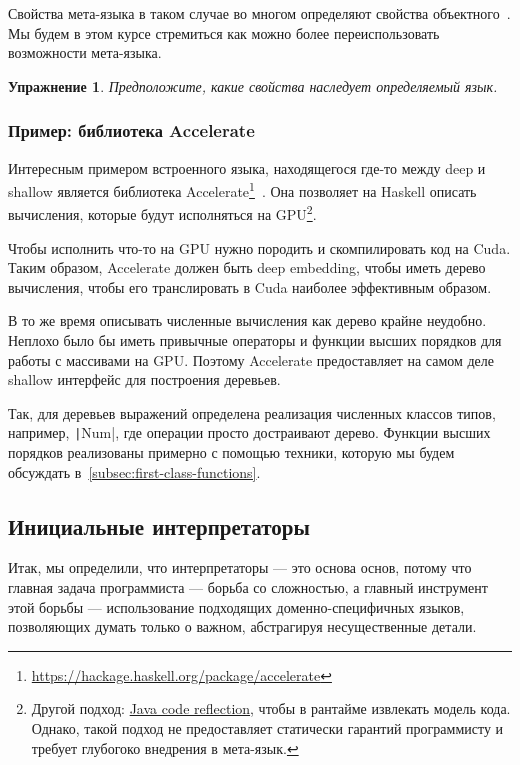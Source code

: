 \documentclass[12pt]{article}
\newtheorem{task}{Упражнение}
\begin{document}
    Свойства мета-языка в таком случае во многом определяют свойства объектного~\cite{reynolds1972definitional,reynolds1998definitional}.
    Мы будем в этом курсе стремиться как можно более переиспользовать возможности мета-языка.

    \begin{task}
        Предположите, какие свойства наследует определяемый язык.
    \end{task}

    \subsubsection{Пример: библиотека Accelerate}

    Интересным примером встроенного языка, находящегося где-то между deep и shallow является библиотека Accelerate\footnote{\url{https://hackage.haskell.org/package/accelerate}}~\cite[chapter 6]{marlow2011parallel}.
    Она позволяет на Haskell описать вычисления, которые будут исполняться на GPU\footnote{Другой подход: \href{https://youtu.be/6c0DB2kwF_Q?si=-nB7AkCsDWB_Q-hy}{Java code reflection}, чтобы в рантайме извлекать модель кода. Однако, такой подход не предоставляет статически гарантий программисту и требует глубогоко внедрения в мета-язык.}.

    Чтобы исполнить что-то на GPU нужно породить и скомпилировать код на Cuda.
    Таким образом, Accelerate должен быть deep embedding, чтобы иметь дерево вычисления, чтобы его транслировать в Cuda наиболее эффективным образом.
    
    В то же время описывать численные вычисления как дерево крайне неудобно.
    Неплохо было бы иметь привычные операторы и функции высших порядков для работы с массивами на GPU\@.
    Поэтому Accelerate предоставляет на самом деле shallow интерфейс для построения деревьев.

    Так, для деревьев выражений определена реализация численных классов типов, например, \texttt|Num|, где операции просто достраивают дерево.
    Функции высших порядков реализованы примерно с помощью техники, которую мы будем обсуждать в~\ref{subsec:first-class-functions}.


    \subsection{Инициальные интерпретаторы}

    Итак, мы определили, что интерпретаторы --- это основа основ, потому что главная задача программиста --- борьба со сложностью, а главный инструмент этой борьбы --- использование подходящих доменно-специфичных языков, позволяющих думать только о важном, абстрагируя несущественные детали.
\end{document}
